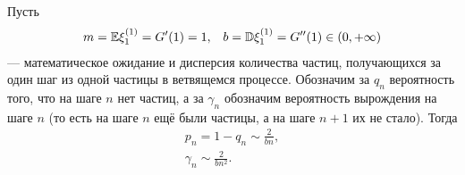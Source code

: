 \documentclass[../main.tex]{subfiles}
\begin{document}
\begin{thm}
 Пусть
 \begin{align*}
  m = \mathbb E \xi_1^{(1)} = G'(1) = 1, && b = \mathbb D \xi_1^{(1)} = G''(1) \in (0, +\infty)
 \end{align*}
 --- математическое ожидание и дисперсия количества частиц, получающихся за один шаг из одной частицы в ветвящемся процессе. Обозначим за $ q_n $ вероятность того, что на шаге $ n $ нет частиц, а за $ \gamma_n $ обозначим вероятность вырождения на шаге $ n $ (то есть на шаге $ n $ ещё были частицы, а на шаге $ n + 1 $ их не стало). Тогда
 \begin{align}
  \label{eq1:thm:speed_of_branching_process} p_n = 1 - q_n \sim \frac{2}{bn}, \\
  \label{eq2:thm:speed_of_branching_process} \gamma_n \sim \frac{2}{bn^{2}}.
 \end{align}
\end{thm}
\end{document}

